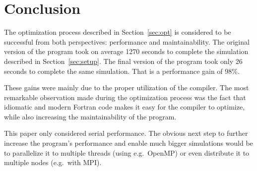 \documentclass[twoside,11pt]{article}
\begin{document}

\section{Conclusion} %
\label{sec:con}

The optimization process described in Section~\ref{sec:opt} is
considered to be successful from both perspectives: performance and
maintainability.
The original version of the program took on average 1270 seconds to
complete the simulation described in Section~\ref{sec:setup}.
The final version of the program took only 26 seconds to complete the
same simulation.
That is a performance gain of 98\%.

These gains were mainly due to the proper utilization of the compiler.
The most remarkable observation made during the optimization process
was the fact that idiomatic and modern Fortran code makes it
easy for the compiler to optimize, while also increasing the
maintainability of the program.

This paper only considered serial performance.
The obvious next step to further increase the program's performance
and enable much bigger simulations would be to parallelize it to
multiple threads (using e.g.\ OpenMP) or even distribute it to
multiple nodes (e.g.\ with MPI).



\end{document}

